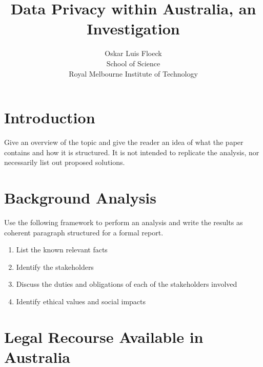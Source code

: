 \documentclass[12pt,a4paper]{article}
\begin{document}
\title{Data Privacy within Australia, an Investigation}

\author{
Oskar Luis Floeck\\
School of Science\\
Royal Melbourne Institute of Technology}

\maketitle

\tableofcontents


\section{Introduction}

Give an overview of the topic and give the reader an idea of what the paper contains and how it is structured. It is not intended to replicate the analysis, nor necessarily list out proposed solutions.


\section{Background Analysis}

Use the following framework to perform an analysis and write the results as coherent paragraph structured for a formal report.

\begin{enumerate}
	\item List the known relevant facts
	\item Identify the stakeholders
	\item Discuss the duties and obligations of each of the stakeholders involved
	\item Identify ethical values and social impacts
\end{enumerate}


\section{Legal Recourse Available in Australia}
\end{document}
